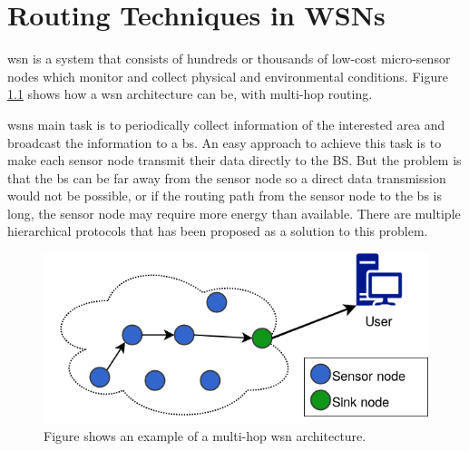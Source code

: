 \documentclass[USenglish]{uit-thesis}
\newcommand{\definition}[1]{%
  \refstepcounter{definition}%
  \par\noindent\textbf{The Definition~\thedefinition. #1}%
  \addcontentsline{def}{definition}
    {\protect\numberline{\thechapter.\thedefinition}#1}\par%
}
\begin{document}









\chapter{Routing Techniques in WSNs}
\glsresetall
\gls{wsn} is a system that consists of hundreds or thousands of low-cost micro-sensor nodes which monitor and collect physical and environmental conditions. Figure \ref{fig:wsn} shows how a \gls{wsn} architecture can be, with multi-hop routing. 


\glspl{wsn}  main task is to periodically collect information of the interested area and broadcast the information to a \gls{bs}. An easy approach to achieve this task is to make each sensor node transmit their data directly to the BS. But the problem is that the \gls{bs} can be far away from the sensor node so a direct data transmission would not be possible, or if the routing path from the sensor node to the \gls{bs} is long, the sensor node may require more energy than available. There are multiple hierarchical protocols that has been proposed as a solution to this problem.

\begin{figure} [!ht]
\centering
\includegraphics[width=\textwidth]{wsn.png}
\caption{Figure shows an example of a multi-hop \gls{wsn} architecture.}
\label{fig:wsn}
\end{figure}
\end{document}
